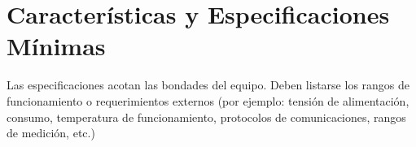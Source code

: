 \section{Características y Especificaciones Mínimas}
    Las especificaciones acotan las bondades del equipo. Deben listarse los
    rangos de funcionamiento o requerimientos externos (por ejemplo: tensión de
    alimentación, consumo, temperatura de funcionamiento, protocolos de
    comunicaciones, rangos de medición, etc.)



